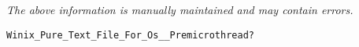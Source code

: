 \label{pkg:pur}

{\tiny \it The above information is manually maintained and may contain errors.}
\begin{verbatim}
Winix_Pure_Text_File_For_Os__Premicrothread?
\end{verbatim}
